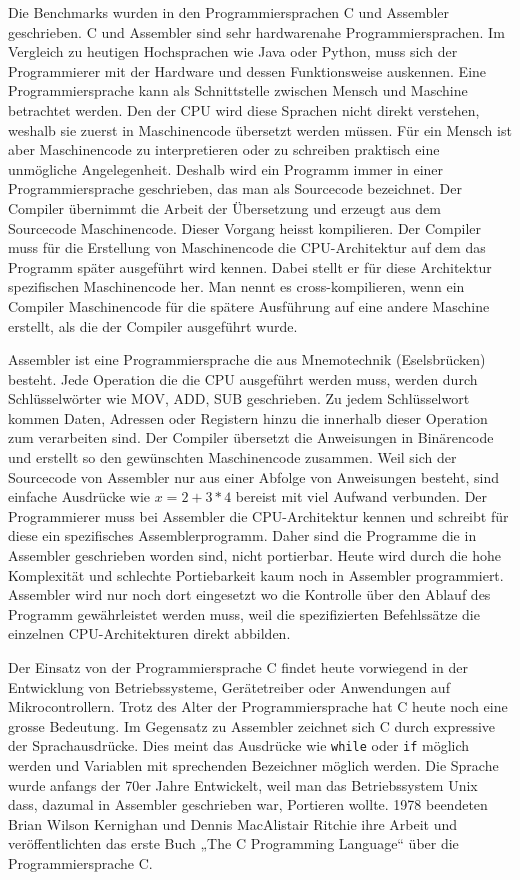 Die Benchmarks wurden in den Programmiersprachen C und Assembler geschrieben. C und Assembler sind sehr hardwarenahe Programmiersprachen. Im Vergleich zu heutigen Hochsprachen wie Java oder Python, muss sich der Programmierer mit der Hardware und dessen Funktionsweise auskennen. Eine Programmiersprache kann als Schnittstelle zwischen Mensch und Maschine betrachtet werden. Den der CPU wird diese Sprachen nicht direkt verstehen, weshalb sie zuerst in Maschinencode übersetzt werden müssen. Für ein Mensch ist aber Maschinencode zu interpretieren oder zu schreiben praktisch eine unmögliche Angelegenheit. Deshalb wird ein Programm immer in einer Programmiersprache geschrieben, das man als Sourcecode bezeichnet. Der Compiler übernimmt die Arbeit der Übersetzung und erzeugt aus dem Sourcecode Maschinencode. Dieser Vorgang heisst kompilieren. Der Compiler muss für die Erstellung von Maschinencode die CPU-Architektur auf dem das Programm später ausgeführt wird kennen. Dabei stellt er für diese Architektur spezifischen Maschinencode her. Man nennt es cross-kompilieren, wenn ein Compiler Maschinencode für die spätere Ausführung auf eine andere Maschine erstellt, als die der Compiler ausgeführt wurde.
\par
Assembler ist eine Programmiersprache die aus Mnemotechnik (Eselsbrücken) besteht. Jede Operation die die CPU ausgeführt werden muss, werden durch Schlüsselwörter wie MOV, ADD, SUB geschrieben. Zu jedem Schlüsselwort kommen Daten, Adressen oder Registern hinzu die innerhalb dieser Operation zum verarbeiten sind. Der Compiler übersetzt die Anweisungen in Binärencode und erstellt so den gewünschten Maschinencode zusammen. Weil sich der Sourcecode von Assembler nur aus einer Abfolge von Anweisungen besteht, sind einfache Ausdrücke wie $x = 2 + 3 * 4$ bereist mit viel Aufwand verbunden. Der Programmierer muss bei Assembler die CPU-Architektur kennen und schreibt für diese ein spezifisches Assemblerprogramm. Daher sind die Programme die in Assembler geschrieben worden sind, nicht portierbar. Heute wird durch die hohe Komplexität und schlechte Portiebarkeit kaum noch in Assembler programmiert. Assembler wird nur noch dort eingesetzt wo die Kontrolle über den Ablauf des Programm gewährleistet werden muss, weil die spezifizierten Befehlssätze die einzelnen CPU-Architekturen direkt abbilden.
\par
Der Einsatz von der Programmiersprache C findet heute vorwiegend in der Entwicklung von Betriebssysteme, Gerätetreiber oder Anwendungen auf Mikrocontrollern. Trotz des Alter der Programmiersprache hat C heute noch eine grosse Bedeutung. Im Gegensatz zu Assembler zeichnet sich C durch expressive der Sprachausdrücke. Dies meint das Ausdrücke wie \texttt{while} oder \texttt{if} möglich werden und Variablen mit sprechenden Bezeichner möglich werden. Die Sprache wurde anfangs der 70er Jahre Entwickelt, weil man das Betriebssystem Unix dass, dazumal in Assembler geschrieben war, Portieren wollte. 1978 beendeten Brian Wilson Kernighan und Dennis MacAlistair Ritchie ihre Arbeit und veröffentlichten  das erste Buch „The C Programming Language“ über die Programmiersprache C.



